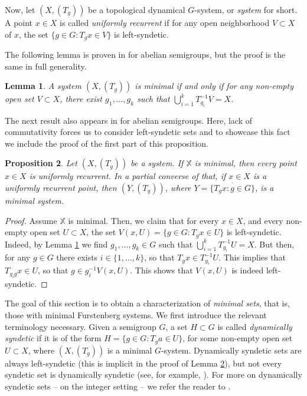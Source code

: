 \documentclass{amsart}
\numberwithin{equation}{section}
\newtheorem{lemma}{Lemma}[section]
\newtheorem{proposition}[lemma]{Proposition}
\theoremstyle{definition}
\theoremstyle{plain}
\begin{document}
Now, let $(X,(T_g))$ be a topological dynamical $G$-system, or \textit{system} for 
short. A point $x\in X$ is called \textit{uniformly recurrent} if for any 
open neighborhood $V\subset X$ of $x$, the set $\{g\in G: T_gx \in V\}$ is 
left-syndetic. 

The following lemma is proven in \cite[Lemma 1.14]{Fur_book} for
abelian semigroups, but the proof is the same in full generality.

\begin{lemma}\label{minimal systems by coverings}
A system $(X,(T_g))$ is minimal if and only if for any non-empty open set $V\subset X$, there exist $g_1,\ldots,g_k$ such that $\bigcup_{i=1}^k T_{g_i}^{-1}V=X$. 
\end{lemma}

The next result also appears in \cite{Fur_book} for 
abelian semigroups. Here, 
lack of commutativity forces us to consider left-syndetic 
sets and to showcase this fact we include the proof of 
the first part of this proposition.      

\begin{proposition}\label{minimal systems and uniform recurrence}
Let $(X,(T_g))$ be a system. If $\mathbb{X}$ is minimal, then every point $x\in X$ is uniformly recurrent. In a partial converse of that, if $x\in X$ is a uniformly recurrent point, then $(Y,(T_g))$, where $Y=\overline{\{T_gx: g\in G\}}$, is a minimal system.
\end{proposition}

\begin{proof}
Assume $\mathbb{X}$ is minimal. Then, we claim that for every $x\in X$, and
every non-empty open set $U\subset X$, the set $V(x,U)=\{g\in G: T_gx\in U\}$ 
is left-syndetic. Indeed, by Lemma \ref{minimal systems by coverings} we find $g_1,\ldots,g_k\in G$ such that $\bigcup_{i=1}^k T_{g_i}^{-1}U=X$. But then, for any $g\in G$ there exists $i\in \{1,\ldots,k\}$, so that $T_gx\in T_{g_i}^{-1}U$. This implies that $T_{g_ig}x\in U$, so that $g\in g_i^{-1}V(x,U)$. This shows that $V(x,U)$ is indeed left-syndetic.
\end{proof}

The goal of this section is to obtain a characterization of \textit{minimal sets}, that is, those with minimal Furstenberg systems. We first introduce the relevant terminology necessary. Given a semigroup $G$, a set $H\subset G$ is called \textit{dynamically syndetic} if it is of the form $H=\{g\in G: T_ga\in U\}$, for some non-empty open set $U\subset X$, where $(X,(T_g))$ is a minimal $G$-system. Dynamically syndetic sets are always left-syndetic (this is implicit in the proof of Lemma \ref{minimal systems and uniform recurrence}), but not every syndetic set is dynamically syndetic (see, for example, \cite[(1.1)]{Glass_Le}). For more on dynamically syndetic sets -- on the integer setting -- we refer the reader to \cite{Glass_Le}. 
\end{document}
